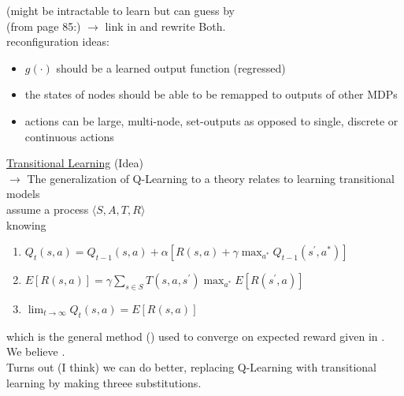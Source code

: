 \begin{center}
\end{center}
(might be intractable to learn but can guess by\\
(from page 85:) $\rightarrow$ link in and rewrite Both.\\

reconfiguration ideas:
\begin{itemize}[label=$\square$]
\item $g(\cdot)$ should be a learned output function (regressed)
\item the states of nodes should be able to be remapped to outputs of other MDPs
\item actions can be large, multi-node, set-outputs as opposed to single, discrete or continuous actions
\end{itemize}

\newpage

\underline{Transitional Learning} (Idea) \\

$\rightarrow$ The generalization of Q-Learning to a theory relates to learning transitional models \\

assume a process $\langle S, A, T, R \rangle$ \\

knowing
\begin{enumerate}[label=\circled{\arabic*}:]
\item $Q_t( s, a ) = Q_{t-1}( s, a ) + \alpha \left[ R( s, a ) + \gamma \max_{a^\ast}Q_{t-1}( s^\prime, a^\ast) \right]$
\item $E\left[ R( s, a) \right] = \gamma \sum_{s \in S} T( s, a, s^\prime ) \max_{a^\ast} E\left[ R( s^\prime, a ) \right]$
\item $\lim_{ t \to \infty } Q_t( s, a ) = E\left[ R( s, a ) \right]$
\end{enumerate}
which is the general method () used to converge on expected reward given in . We believe .\\

Turns out (I think) we can do better, replacing Q-Learning with transitional learning by making threee substitutions.


